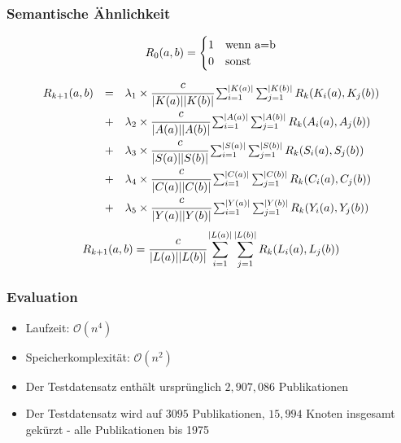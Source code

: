 \documentclass[12pt, xcolor=table]{beamer}
\begin{document}
\begin{frame}
    \frametitle{Semantische Ähnlichkeit}
\scriptsize{
\[
 R_0(a,b) =
    \begin{cases}
     1 & \text{wenn } $a$ = $b$ \\
     0 & \text{sonst}\\
    \end{cases}
\]
\newline
{}
\[
\begin{array}{lcl}
 R_{k+1}(a,b) & = & 
        \lambda_1\times\cfrac{c}{|K(a)||K(b)|}
        \sum_{i=1}^{|K(a)|} \sum_{j=1}^{|K(b)|} R_k(K_i(a),K_j(b))
        \\ & + &
        \lambda_2\times\cfrac{c}{|A(a)||A(b)|}
        \sum_{i=1}^{|A(a)|} \sum_{j=1}^{|A(b)|} R_k(A_i(a),A_j(b))
        \\ & + &
        \lambda_3\times\cfrac{c}{|S(a)||S(b)|}
        \sum_{i=1}^{|S(a)|} \sum_{j=1}^{|S(b)|} R_k(S_i(a),S_j(b))
        \\ & + &
        \lambda_4\times\cfrac{c}{|C(a)||C(b)|}
        \sum_{i=1}^{|C(a)|} \sum_{j=1}^{|C(b)|} R_k(C_i(a),C_j(b))
        \\ & + &
        \lambda_5\times\cfrac{c}{|Y(a)||Y(b)|}
        \sum_{i=1}^{|Y(a)|} \sum_{j=1}^{|Y(b)|} R_k(Y_i(a),Y_j(b))
\end{array}
\]
\newline
{}
\[
R_{k+1}(a,b)  = 
        \cfrac{c}{|L(a)||L(b)|}
        \sum_{i=1}^{|L(a)|} \sum_{j=1}^{|L(b)|} R_k(L_i(a),L_j(b))
\]
}
\end{frame}

\begin{frame}
    \frametitle{Evaluation}
    \begin{itemize}
        \item Laufzeit: $\mathcal{O}(n^4)$
        \item Speicherkomplexität: $\mathcal{O}(n^2)$
        \item Der Testdatensatz enthält ursprünglich $2,907,086$ Publikationen
        \item Der Testdatensatz wird auf $3095$ Publikationen, $15,994$ Knoten insgesamt gekürzt - alle Publikationen bis 1975
    \end{itemize}
\end{frame}
\end{document}
